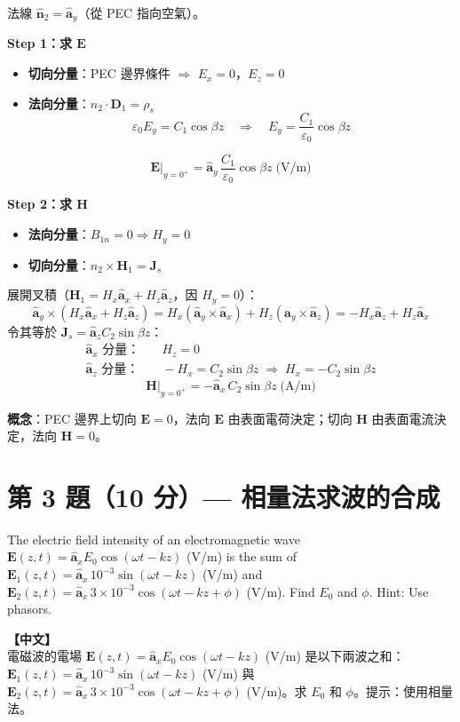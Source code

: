 \documentclass[12pt,a4paper]{article}
\newcommand{\vE}{\mathbf{E}}
\newcommand{\vH}{\mathbf{H}}
\newcommand{\vJ}{\mathbf{J}}
\newcommand{\vD}{\mathbf{D}}
\newcommand{\ax}{\hat{\mathbf{a}}_x}
\newcommand{\ay}{\hat{\mathbf{a}}_y}
\newcommand{\az}{\hat{\mathbf{a}}_z}
\begin{document}
\begin{solutionbox}[詳解]

法線 $\hat{\mathbf{n}}_2 = \ay$（從 PEC 指向空氣）。

\textbf{Step 1：求 $\vE$}

\begin{itemize}
  \item \textbf{切向分量}：PEC 邊界條件 $\Rightarrow$ $E_x = 0$，$E_z = 0$
  \item \textbf{法向分量}：$\hat{n}_2\cdot\vD_1 = \rho_s$
    \[
      \varepsilon_0 E_y = C_1\cos\beta z
      \quad\Rightarrow\quad E_y = \frac{C_1}{\varepsilon_0}\cos\beta z
    \]
\end{itemize}
\[
  \boxed{\vE\big|_{y=0^+} = \ay\,\frac{C_1}{\varepsilon_0}\cos\beta z \;\text{(V/m)}}
\]

\textbf{Step 2：求 $\vH$}

\begin{itemize}
  \item \textbf{法向分量}：$B_{1n} = 0 \Rightarrow H_y = 0$
  \item \textbf{切向分量}：$\hat{n}_2\times\vH_1 = \vJ_s$
\end{itemize}

展開叉積（$\vH_1 = H_x\ax + H_z\az$，因 $H_y=0$）：
\[
  \ay\times(H_x\ax + H_z\az) = H_x(\ay\times\ax) + H_z(\ay\times\az)
  = -H_x\az + H_z\ax
\]
令其等於 $\vJ_s = \az C_2\sin\beta z$：
\begin{align*}
  \ax\text{ 分量}：&\quad H_z = 0 \\
  \az\text{ 分量}：&\quad -H_x = C_2\sin\beta z \;\Rightarrow\; H_x = -C_2\sin\beta z
\end{align*}
\[
  \boxed{\vH\big|_{y=0^+} = -\ax\,C_2\sin\beta z \;\text{(A/m)}}
\]

\textbf{概念}：PEC 邊界上切向 $\vE = 0$，法向 $\vE$ 由表面電荷決定；切向 $\vH$ 由表面電流決定，法向 $\vH = 0$。
\end{solutionbox}

\section{第 3 題（10 分）— 相量法求波的合成}

\begin{questionbox}
The electric field intensity of an electromagnetic wave $\vE(z,t) = \ax E_0\cos(\omega t - kz)$ (V/m) is the sum of $\vE_1(z,t) = \ax\,10^{-3}\sin(\omega t - kz)$ (V/m) and $\vE_2(z,t) = \ax\,3\times10^{-3}\cos(\omega t - kz + \phi)$ (V/m). Find $E_0$ and $\phi$. Hint: Use phasors.

\medskip\noindent\textbf{【中文】}\\
電磁波的電場 $\vE(z,t) = \ax E_0\cos(\omega t - kz)$ (V/m) 是以下兩波之和：$\vE_1(z,t) = \ax\,10^{-3}\sin(\omega t - kz)$ (V/m) 與 $\vE_2(z,t) = \ax\,3\times10^{-3}\cos(\omega t - kz + \phi)$ (V/m)。求 $E_0$ 和 $\phi$。提示：使用相量法。
\end{questionbox}
\end{document}
